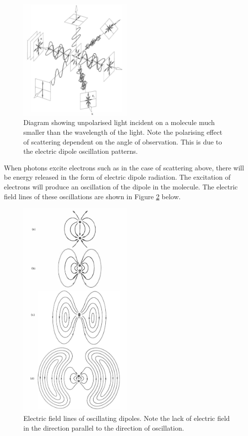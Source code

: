 \documentclass{article}
\begin{document}
\begin{figure}[H]
    \centering
    \includegraphics[width=0.5\textwidth]{scattering.png}
    \caption{Diagram showing unpolarised light incident on a molecule much 
    smaller than the wavelength of the light. Note the polarising effect of 
    scattering dependent on the angle of observation. This is due to the 
    electric dipole oscillation patterns.}
    \label{fig:scatter}
\end{figure}

When photons excite electrons such as in the case of scattering above, there 
will be energy released in the form of electric dipole radiation. The excitation 
of electrons will produce an oscillation of the dipole in the molecule. The 
electric field lines of these oscillations are shown in Figure \ref{fig:electric}
below.

\begin{figure}[H]
    \centering
    \includegraphics[width=0.5\textwidth]{efiled.png}
    \caption{Electric field lines of oscillating dipoles. Note the lack of 
    electric field in the direction parallel to the direction of oscillation.}
    \label{fig:electric}
\end{figure}
\end{document}
